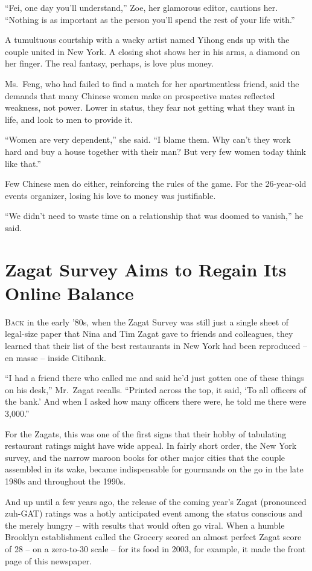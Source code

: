 ﻿\documentclass[12pt]{article}
\begin{document}
``Fei, one day you'll understand,'' Zoe, her glamorous editor, cautions her. ``Nothing is as
important as the person you'll spend the rest of your life with.''

A tumultuous courtship with a wacky artist named Yihong ends up with the couple united in New York.
A closing shot shows her in his arms, a diamond on her finger. The real fantasy, perhaps, is love
plus money.

Ms.~Feng, who had failed to find a match for her apartmentless friend, said the demands that many
Chinese women make on prospective mates reflected weakness, not power. Lower in status, they fear
not getting what they want in life, and look to men to provide it.

``Women are very dependent,'' she said. ``I blame them. Why can't they work hard and buy a house
together with their man? But very few women today think like that.''

Few Chinese men do either, reinforcing the rules of the game. For the 26-year-old events organizer,
losing his love to money was justifiable.

``We didn't need to waste time on a relationship that was doomed to vanish,'' he said.

\section{Zagat Survey Aims to Regain Its Online Balance}

\lettrine{B}{ack} in the early '80s, when the Zagat Survey was still just a
single sheet of legal-size paper that Nina and Tim Zagat gave to friends and colleagues, they
learned that their list of the best restaurants in New York had been reproduced -- en masse --
inside Citibank.

``I had a friend there who called me and said he'd just gotten one of these things on his desk,''
Mr.~Zagat recalls. ``Printed across the top, it said, `To all officers of the bank.' And when I
asked how many officers there were, he told me there were 3,000.''

For the Zagats, this was one of the first signs that their hobby of tabulating restaurant ratings
might have wide appeal. In fairly short order, the New York survey, and the narrow maroon books for
other major cities that the couple assembled in its wake, became indispensable for gourmands on the
go in the late 1980s and throughout the 1990s.

And up until a few years ago, the release of the coming year's Zagat (pronounced zuh-GAT) ratings
was a hotly anticipated event among the status conscious and the merely hungry -- with results that
would often go viral. When a humble Brooklyn establishment called the Grocery scored an almost
perfect Zagat score of 28 -- on a zero-to-30 scale -- for its food in 2003, for example, it made the
front page of this newspaper.
\end{document}
